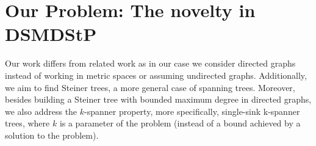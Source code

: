 

\section{Our Problem: The novelty in DSMDStP}
\label{sec:DSMDStP_new_problem}

Our work differs from related work as in our case we consider directed graphs instead of working in metric spaces or assuming undirected graphs. Additionally, we aim to find Steiner trees, 
a more general case of spanning trees. Moreover, besides building a Steiner tree with bounded maximum degree in directed graphs, we also address the $k$-spanner 
property, more specifically, 
single-sink k-spanner trees, where $k$ is a parameter of the problem (instead of a bound achieved by a solution to the problem). 

